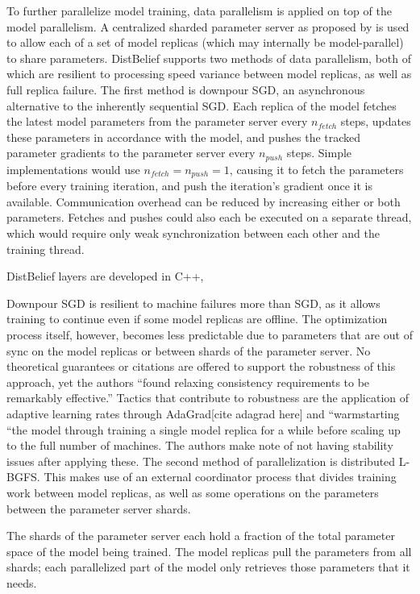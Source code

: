 To further parallelize model training, data parallelism is applied on top of the model parallelism. A centralized sharded parameter server as proposed by \citet{Li2014Comms}\citep{Li2014Scaling} is used to allow each of a set of model replicas (which may internally be model-parallel) to share parameters. DistBelief supports two methods of data parallelism, both of which are resilient to processing speed variance between model replicas, as well as full replica failure. The first method is downpour SGD, an asynchronous alternative to the inherently sequential SGD. Each replica of the model fetches the latest model parameters from the parameter server every $n_{fetch}$ steps, updates these parameters in accordance with the model, and pushes the tracked parameter gradients to the parameter server every $n_{push}$ steps. Simple implementations would use $n_{fetch} = n_{push} = 1$, causing it to fetch the parameters before every training iteration, and push the iteration’s gradient once it is available. Communication overhead can be reduced by increasing either or both parameters. Fetches and pushes could also each be executed on a separate thread, which would require only weak synchronization between each other and the training thread.

DistBelief layers are developed in C++, 

Downpour SGD is resilient to machine failures more than SGD, as it allows training to continue even if some model replicas are offline. The optimization process itself, however, becomes less predictable due to parameters that are out of sync on the model replicas or between shards of the parameter server. No theoretical guarantees or citations are offered to support the robustness of this approach, yet the authors “found relaxing consistency requirements to be remarkably effective.” Tactics that contribute to robustness are the application of adaptive learning rates through AdaGrad[cite adagrad here] and “warmstarting “the model through training a single model replica for a while before scaling up to the full number of machines. The authors make note of not having stability issues after applying these.
The second method of parallelization is distributed L-BGFS. This makes use of an external coordinator process that divides training work between model replicas, as well as some operations on the parameters between the parameter server shards.

The shards of the parameter server each hold a fraction of the total parameter space of the model being trained. The model replicas pull the parameters from all shards; each parallelized part of the model only retrieves those parameters that it needs.

